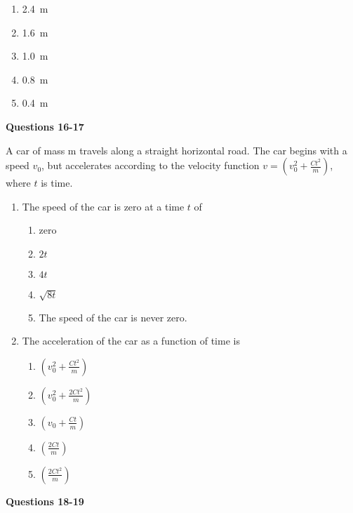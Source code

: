 \documentclass{../../oss-apphys}
\begin{document}
\begin{multicols}{2}
\begin{enumerate}[resume,leftmargin=18pt]

    \begin{enumerate}[noitemsep,topsep=0pt]
    \item\SI{2.4}{\metre}
    \item\SI{1.6}{\metre}
    \item\SI{1.0}{\metre}
    \item\SI{0.8}{\metre}
    \item\SI{0.4}{\metre}
    \end{enumerate}
  \end{enumerate}
  
  \textbf{Questions 16-17}

  A car of mass m travels along a straight horizontal road. The car begins with
  a speed $v_0$, but accelerates according to the velocity function
  $\displaystyle v=\left(v_0^2+\frac{Ct^2}{m}\right)$, where $t$ is time.

  \begin{enumerate}[resume,leftmargin=18pt]
  \item The speed of the car is zero at a time $t$ of
    \begin{enumerate}[noitemsep,topsep=0pt,leftmargin=18pt,label=(\Alph*)]
    \item zero
    \item $2t$
    \item $4t$
    \item $\sqrt{8t}$
    \item The speed of the car is never zero.
    \end{enumerate}
    
  \item The acceleration of the car as a function of time is
    \begin{enumerate}[noitemsep,topsep=0pt,leftmargin=18pt,label=(\Alph*)]
    \item $\displaystyle\left(v_0^2+\frac{Ct^2}{m}\right)$
    \item $\displaystyle\left(v_0^2+\frac{2Ct^2}{m}\right)$
    \item $\displaystyle\left(v_0+\frac{Ct}{m}\right)$
    \item $\displaystyle\left(\frac{2Ct}{m}\right)$
    \item $\displaystyle\left(\frac{2Ct^2}{m}\right)$
    \end{enumerate}
  \end{enumerate}
  \columnbreak
  
  \textbf{Questions 18-19}


\end{multicols}
\end{document}
